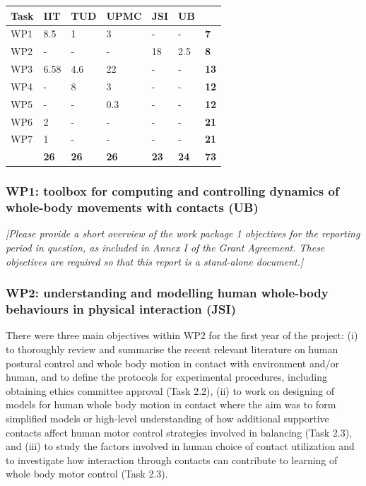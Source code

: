 \documentclass[12pt,a4paper,twoside]{article}
\begin{document}
\begin{longtable}{|C{1.5cm}|C{1.5cm}|C{1.5cm}|C{2cm}|C{2cm}|C{2cm}|C{2cm}|}
\footnotesize \textbf{Task}& \footnotesize \textbf{IIT}&\footnotesize \textbf{TUD}&\footnotesize \textbf{UPMC}& \footnotesize \textbf{JSI} &\footnotesize \textbf{UB} &  \\ \hline
\footnotesize WP1 &  8.5    &  1    &  3     & -   & -     & \textbf{7}  \\  \hline
\footnotesize WP2 &  -        &  -     &  -       & 18 & 2.5 & \textbf{8}\\ \hline
\footnotesize WP3 &  6.58 & 4.6  &  22    & -    & -     & \textbf{13}\\ \hline
\footnotesize WP4 & -         & 8     &  3      & -   & -     & \textbf{12}\\ \hline
\footnotesize WP5 & -         & -      &  0.3   & -    & -     & \textbf{12}\\ \hline
\footnotesize WP6 & 2        & -      &  -        & -    & -     & \textbf{21}\\ \hline
\footnotesize WP7 & 1        & -      &  -        & -    & -     & \textbf{21}\\ \hline
{}  & \textbf{26} & \textbf{26} & \textbf{26} & \textbf{23} & \textbf{24}  & \textbf{73} \\  
\end{longtable}

\subsubsection{WP1: toolbox for computing and controlling dynamics of whole-body movements with contacts (UB)}

\emph{\color{red}[Please provide a short overview of the work package 1 objectives for the reporting period in question, as included in Annex I of the Grant Agreement. These objectives are required so that this report is a stand-alone document.]}

\subsubsection{WP2: understanding and modelling human whole-body behaviours in physical interaction (JSI)}

There were three main objectives within WP2 for the first year of the project: (i) to thoroughly review and summarise the recent relevant literature on human postural control and whole body motion in contact with environment and/or human, and to define the protocols for experimental procedures, including obtaining ethics committee approval (Task 2.2), (ii) to work on designing of models for human whole body motion in contact where the aim was to form simplified models or high-level understanding of how additional supportive contacts affect human motor control strategies involved in balancing (Task 2.3), and (iii) to study the factors involved in human choice of contact utilization and to investigate how interaction through contacts can contribute to learning of whole body motor control (Task 2.3).
\end{document}
